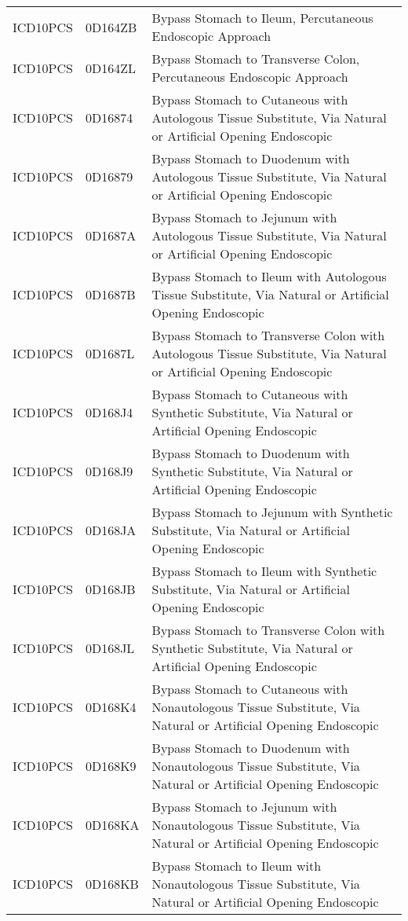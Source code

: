 \begin{longtable}{p{}p{}p{}}
  ICD10PCS & 0D164ZB & Bypass Stomach to Ileum, Percutaneous Endoscopic Approach \\ 
  ICD10PCS & 0D164ZL & Bypass Stomach to Transverse Colon, Percutaneous Endoscopic Approach \\ 
  ICD10PCS & 0D16874 & Bypass Stomach to Cutaneous with Autologous Tissue Substitute, Via Natural or Artificial Opening Endoscopic \\ 
  ICD10PCS & 0D16879 & Bypass Stomach to Duodenum with Autologous Tissue Substitute, Via Natural or Artificial Opening Endoscopic \\ 
  ICD10PCS & 0D1687A & Bypass Stomach to Jejunum with Autologous Tissue Substitute, Via Natural or Artificial Opening Endoscopic \\ 
  ICD10PCS & 0D1687B & Bypass Stomach to Ileum with Autologous Tissue Substitute, Via Natural or Artificial Opening Endoscopic \\ 
  ICD10PCS & 0D1687L & Bypass Stomach to Transverse Colon with Autologous Tissue Substitute, Via Natural or Artificial Opening Endoscopic \\ 
  ICD10PCS & 0D168J4 & Bypass Stomach to Cutaneous with Synthetic Substitute, Via Natural or Artificial Opening Endoscopic \\ 
  ICD10PCS & 0D168J9 & Bypass Stomach to Duodenum with Synthetic Substitute, Via Natural or Artificial Opening Endoscopic \\ 
  ICD10PCS & 0D168JA & Bypass Stomach to Jejunum with Synthetic Substitute, Via Natural or Artificial Opening Endoscopic \\ 
  ICD10PCS & 0D168JB & Bypass Stomach to Ileum with Synthetic Substitute, Via Natural or Artificial Opening Endoscopic \\ 
  ICD10PCS & 0D168JL & Bypass Stomach to Transverse Colon with Synthetic Substitute, Via Natural or Artificial Opening Endoscopic \\ 
  ICD10PCS & 0D168K4 & Bypass Stomach to Cutaneous with Nonautologous Tissue Substitute, Via Natural or Artificial Opening Endoscopic \\ 
  ICD10PCS & 0D168K9 & Bypass Stomach to Duodenum with Nonautologous Tissue Substitute, Via Natural or Artificial Opening Endoscopic \\ 
  ICD10PCS & 0D168KA & Bypass Stomach to Jejunum with Nonautologous Tissue Substitute, Via Natural or Artificial Opening Endoscopic \\ 
  ICD10PCS & 0D168KB & Bypass Stomach to Ileum with Nonautologous Tissue Substitute, Via Natural or Artificial Opening Endoscopic \\ 

\end{longtable}
